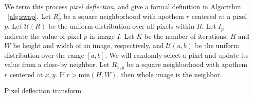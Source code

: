
We term this process \textit{pixel deflection}, and give a formal definition in Algorithm ~\ref{alg:swap}.
Let $R^r_{p}$ be a square neighborhood with apothem $r$ centered at a pixel $p$.
Let $\mathcal{U}(R)$ be the uniform distribution over all pixels within $R$.
Let $I_p$ indicate the value of pixel $p$ in image $I$.
Let $K$ be the number of iterations, $H$ and $W$ be height and width of an image, respectively, and $\mathcal{U}(a,b)$ be the uniform distribution over the range $[a,b]$. 
We will randomly select a pixel and update its value from a close-by neighbor.
Let $R_{x,y}$ be a square neighborhood with apothem $r$ centered at $x,y$.
If $r>\text{min}(H,W)$, then whole image is the neighbor. %


\begin{algorithm}[H]
    \caption[Pixel Deflection Transform]{Pixel deflection transform}
    \label{alg:swap}
\end{algorithm}


